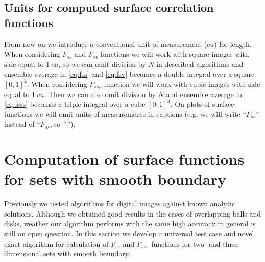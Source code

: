 \documentclass[preprint]{elsarticle}
\begin{document}
\subsection{Units for computed surface correlation functions}
From now on we introduce a conventional unit of measurement ($cu$) for length.
When considering $F_{ss}$ and $F_{sv}$ functions we will work with square images
with side equal to $1\ cu$, so we can omit division by $N$ in described
algorithms and ensemble average in \cref{eq:fss} and \cref{eq:fsv} becomes a
double integral over a square $[0, 1]^2$. When considering $F_{sss}$ function we
will work with cubic images with side equal to $1\ cu$. Then we can also omit
division by $N$ and ensemble average in \cref{eq:fsss} becomes a triple integral
over a cube $[0, 1]^3$. On plots of surface functions we will omit units of
measurements in captions (e.g. we will write ``$F_{ss}$'' instead of
``$F_{ss}, cu^{-2}$'').

\section{Computation of surface functions for sets with smooth boundary}
\label{sec:algo-precise}
Previously \cite{Samarin} we tested algorithms for digital images against known
analytic solutions. Although we obtained good results in the cases of
overlapping balls and disks, weather our algorithm performs with the same high
accuracy in general is still an open question. In this section we develop a
universal test case and novel exact algorithm for calculation of $F_{ss}$ and
$F_{sss}$ functions for two- and three-dimensional sets with smooth boundary.
\end{document}
